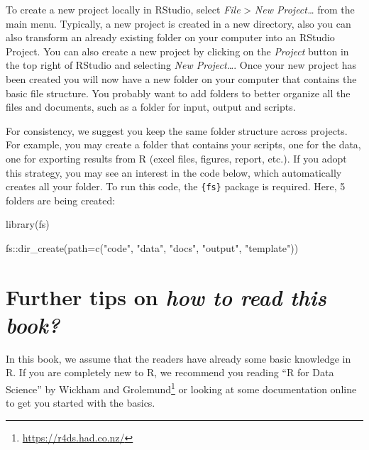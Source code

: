 \documentclass[
]{krantz}
\makeatletter
\newenvironment{Shaded}{\begin{snugshade}}{\end{snugshade}}
\newcommand{\AttributeTok}[1]{\textcolor[rgb]{0.61,0.61,0.61}{#1}}
\newcommand{\FunctionTok}[1]{\textcolor[rgb]{0,0,0}{#1}}
\newcommand{\NormalTok}[1]{#1}
\newcommand{\SpecialCharTok}[1]{\textcolor[rgb]{0,0,0}{#1}}
\newcommand{\StringTok}[1]{\textcolor[rgb]{0.5,0.5,0.5}{#1}}
\renewcommand{\href}[2]{#2\footnote{\url{#1}}}
\newenvironment{kframe}{%
\medskip{}
\setlength{\fboxsep}{.8em}
 \def\at@end@of@kframe{}%
 \ifinner\ifhmode%
  \def\at@end@of@kframe{\end{minipage}}%
  \begin{minipage}{\columnwidth}%
 \fi\fi%
 \def\FrameCommand##1{\hskip\@totalleftmargin \hskip-\fboxsep
 \colorbox{shadecolor}{##1}\hskip-\fboxsep
     \hskip-\linewidth \hskip-\@totalleftmargin \hskip\columnwidth}%
 \MakeFramed {\advance\hsize-\width
   \@totalleftmargin\z@ \linewidth\hsize
   \@setminipage}}%
 {\par\unskip\endMakeFramed%
 \at@end@of@kframe}
\renewenvironment{Shaded}{\begin{kframe}}{\end{kframe}}
\makeatother
\begin{document}
To create a new project locally in RStudio, select \emph{File} \textgreater{} \emph{New Project\ldots{}} from the main menu. Typically, a new project is created in a new directory, also you can also transform an already existing folder on your computer into an RStudio Project. You can also create a new project by clicking on the \emph{Project} button in the top right of RStudio and selecting \emph{New Project\ldots{}}. Once your new project has been created you will now have a new folder on your computer that contains the basic file structure. You probably want to add folders to better organize all the files and documents, such as a folder for input, output and scripts.

For consistency, we suggest you keep the same folder structure across projects. For example, you may create a folder that contains your scripts, one for the data, one for exporting results from R (excel files, figures, report, etc.). If you adopt this strategy, you may see an interest in the code below, which automatically creates all your folder. To run this code, the \texttt{\{fs\}} package is required. Here, 5 folders are being created:

\begin{Shaded}
\begin{Highlighting}[]
\FunctionTok{library}\NormalTok{(fs)}

\NormalTok{fs}\SpecialCharTok{::}\FunctionTok{dir\_create}\NormalTok{(}\AttributeTok{path=}\FunctionTok{c}\NormalTok{(}\StringTok{"code"}\NormalTok{, }\StringTok{"data"}\NormalTok{, }\StringTok{"docs"}\NormalTok{, }\StringTok{"output"}\NormalTok{, }\StringTok{"template"}\NormalTok{))}
\end{Highlighting}
\end{Shaded}

\hypertarget{further-tips-on-how-to-read-this-book}{%
\section{\texorpdfstring{Further tips on \emph{how to read this book?}}{Further tips on how to read this book?}}\label{further-tips-on-how-to-read-this-book}}

In this book, we assume that the readers have already some basic knowledge in R.
If you are completely new to R, we recommend you reading ``R for Data Science'' by \href{https://r4ds.had.co.nz/}{Wickham and Grolemund} \citeyearpar{Wickham2016} or looking at some documentation online to get you started with the basics.
\end{document}
